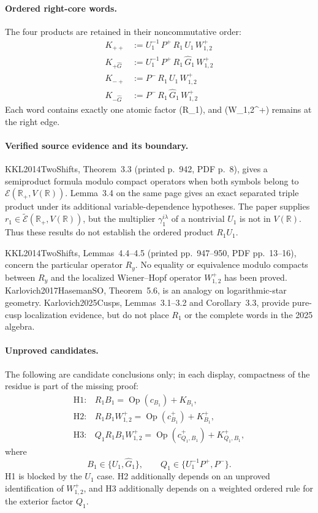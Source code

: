 \paragraph{Ordered right-core words.}
The four products are retained in their noncommutative order:
\[
\begin{aligned}
K_{++} &:= U_{1}^{-1}\,P^{+}\,R_{1}\,U_{1}\,W^+_{1,2} \\
K_{+\widehat G} &:= U_{1}^{-1}\,P^{+}\,R_{1}\,\widehat G_{1}\,W^+_{1,2} \\
K_{-+} &:= P^{-}\,R_{1}\,U_{1}\,W^+_{1,2} \\
K_{-\widehat G} &:= P^{-}\,R_{1}\,\widehat G_{1}\,W^+_{1,2}
\end{aligned}
\]
Each word contains exactly one atomic factor (R_1), and
(W_{1,2}^{+}) remains at the right edge.

\paragraph{Verified source evidence and its boundary.}
KKL2014TwoShifts, Theorem~3.3 (printed p.~942, PDF p.~8), gives a
semiproduct formula modulo compact operators when both symbols belong to
\(\mathcal E(\mathbb R_+,V(\mathbb R))\).  Lemma~3.4 on the same page gives
an exact separated triple product under its additional variable-dependence
hypotheses.  The paper supplies
\(r_1\in\widetilde{\mathcal E}(\mathbb R_+,V(\mathbb R))\), but the multiplier
\(\gamma_1^{i\lambda}\) of a nontrivial \(U_1\) is not in
\(V(\mathbb R)\).  Thus these results do not establish the ordered product
\(R_1U_1\).

KKL2014TwoShifts, Lemmas~4.4--4.5 (printed pp.~947--950, PDF pp.~13--16),
concern the particular operator \(R_y\).  No equality or equivalence modulo
compacts between \(R_y\) and the localized Wiener--Hopf operator
\(W_{1,2}^{+}\) has been proved.  Karlovich2017HasemanSO, Theorem~5.6, is an
analogy on logarithmic-star geometry.  Karlovich2025Cusps, Lemmas~3.1--3.2 and
Corollary~3.3, provide pure-cusp localization evidence, but do not place
\(R_1\) or the complete words in the 2025 algebra.

\paragraph{Unproved candidates.}
The following are candidate conclusions only; in each display, compactness of
the residue is part of the missing proof:
\[
\begin{array}{ll}
\mathrm{H1}:&
 R_1B_1=\operatorname{Op}(c_{B_1})+K_{B_1},\\[0.3em]
\mathrm{H2}:&
 R_1B_1W_{1,2}^{+}
 =\operatorname{Op}(c_{B_1}^{+})+K_{B_1}^{+},\\[0.3em]
\mathrm{H3}:&
 Q_1R_1B_1W_{1,2}^{+}
 =\operatorname{Op}(c_{Q_1,B_1}^{+})+K_{Q_1,B_1}^{+},
\end{array}
\]
where
\[
 B_1\in\{U_1,\widehat G_1\},
 \qquad
 Q_1\in\{U_1^{-1}P^+,P^-\}.
\]
H1 is blocked by the \(U_1\) case.  H2 additionally depends on an
unproved identification of \(W_{1,2}^{+}\), and H3 additionally depends on a
weighted ordered rule for the exterior factor \(Q_1\).


